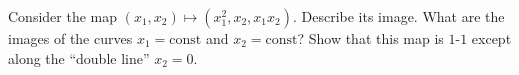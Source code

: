 Consider the map $(x_1, x_2) \mapsto (x_1^2, x_2, x_1 x_2)$. Describe its image. What are the images of the curves $x_1 = \text{const}$ and $x_2 = \text{const}$? Show that this map is $1$-$1$ except along the ``double line'' $x_2 = 0$.
